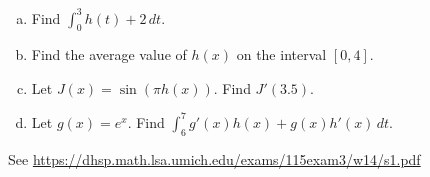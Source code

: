 \documentclass[11pt]{exam}
\begin{document}
\begin{questions}
\begin{enumerate}[(a)]
	\item Find $\displaystyle\int_0^3 h(t)+2 \, dt$.
	\item Find the average value of $h(x)$ on the interval $[0,4]$.
	\item Let $J(x) = \sin(\pi h(x))$. Find $J'(3.5)$.
	\item Let $g(x) = e^x$. Find $\displaystyle\int_6^7 g'(x)h(x) + g(x)h'(x) \, dt$.
\end{enumerate}
\begin{solution}
 See \href{https://dhsp.math.lsa.umich.edu/exams/115exam3/w14/s1.pdf}{https://dhsp.math.lsa.umich.edu/exams/115exam3/w14/s1.pdf}
\end{solution}
\end{questions}
  
\end{document}
